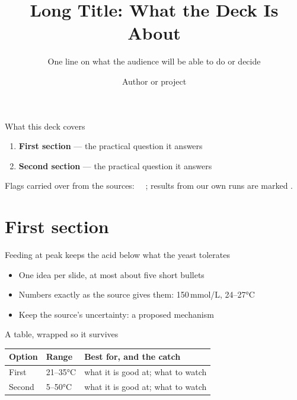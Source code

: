 \documentclass[aspectratio=169,11pt]{beamer}
\title[Short title]{Long Title: What the Deck Is About}
\subtitle{One line on what the audience will be able to do or decide}
\author{Author or project}
\institute{repo or source}
\begin{document}
\begin{frame}[plain]\titlepage\end{frame}

\begin{frame}{What this deck covers}
  \begin{enumerate}
    \item \textbf{First section} --- the practical question it answers
    \item \textbf{Second section} --- the practical question it answers
  \end{enumerate}
  \medskip
  {\small Flags carried over from the sources: \hypothesis\ \contested\ \untested; results from
  our own runs are marked \ownresult.\par}
\end{frame}

\section{First section}

\begin{frame}{Feeding at peak keeps the acid below what the yeast tolerates}
  \begin{itemize}
    \item One idea per slide, at most about five short bullets
    \item Numbers exactly as the source gives them: 150\,mmol/L, 24--27°C
    \item Keep the source's uncertainty: a proposed mechanism \hypothesis
  \end{itemize}
\end{frame}

\begin{frame}{A table, wrapped so it survives}
  \begin{tablebox}[\footnotesize]
  \begin{tabularx}{\linewidth}{@{}l l Y@{}}
    \toprule
    Option & Range & Best for, and the catch \\
    \midrule
    First & 21--35°C & what it is good at; what to watch \\
    Second & 5--50°C & what it is good at; what to watch \\
    \bottomrule
  \end{tabularx}
  \end{tablebox}
\end{frame}
\end{document}
